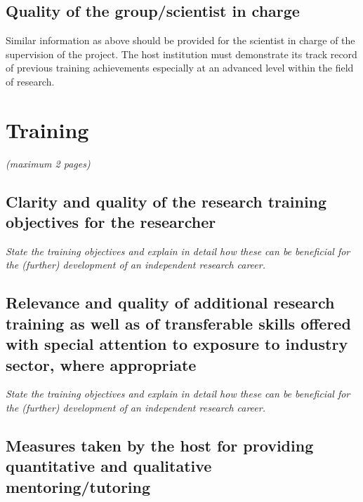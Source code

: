 \documentclass[a4paper,11pt]{article}
\newenvironment{xcomment}{\em}{}
\begin{document}
\subsection{Quality of the group/scientist in charge}

Similar information as above should be provided for the scientist in charge of the supervision of
the project. The host institution must demonstrate its track record of previous training
achievements especially at an advanced level within the field of research.


\newpage
\section{Training}

\begin{xcomment}
 (maximum 2 pages)
\end{xcomment}

\subsection{Clarity and quality of the research training objectives for the researcher}

\begin{xcomment}
 State the training objectives and explain in detail how these can be beneficial for the (further)
development of an independent research career.
\end{xcomment}

\subsection{Relevance and quality of additional research training as well as of transferable skills offered with special attention to exposure to industry sector, where appropriate}

\begin{xcomment}
 State the training objectives and explain in detail how these can be beneficial for the (further)
development of an independent research career.
\end{xcomment}

\subsection{Measures taken by the host for providing quantitative and qualitative mentoring/tutoring}
\end{document}
